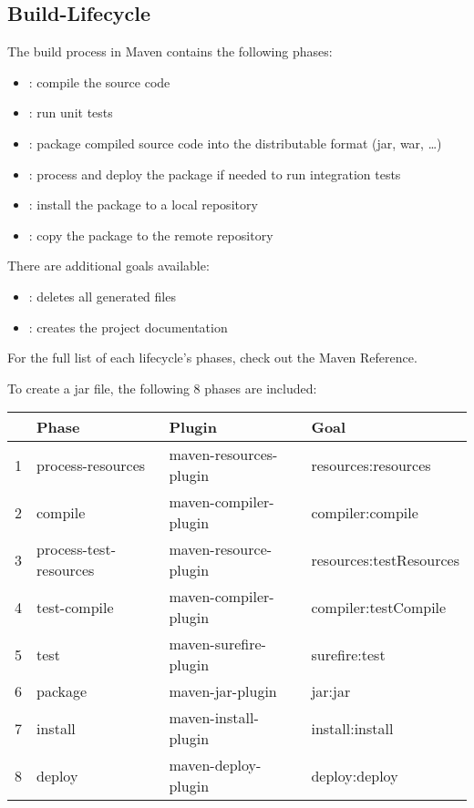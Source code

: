 \subsection{Build-Lifecycle}
The build process in Maven contains the following phases:
\begin{itemize}
\item {}: compile the source code
\item {}: run unit tests
\item {}: package compiled source code into the distributable format (jar, war, …)
\item {}: process and deploy the package if needed to run integration tests
\item {}: install the package to a local repository
\item {}: copy the package to the remote repository
\end{itemize}
%
There are additional goals available:
\begin{itemize}
\item {}: deletes all generated files
\item {}: creates the project documentation
\end{itemize}
\newslide
For the full list of each lifecycle's phases, check out the Maven Reference.

\vspace{3mm}

To create a jar file, the following 8 phases are included:

\begin{tabularx}{\linewidth}{llll}
  & Phase &  Plugin & Goal\\
\hline
1 & process-resources & maven-resources-plugin & resources:resources\\
2 & compile & maven-compiler-plugin & compiler:compile\\
3 & process-test-resources & maven-resource-plugin & resources:testResources\\
4 & test-compile & maven-compiler-plugin & compiler:testCompile\\
5 & test & maven-surefire-plugin  & surefire:test\\
6 & package & maven-jar-plugin & jar:jar\\
7 & install & maven-install-plugin & install:install\\
8 & deploy & maven-deploy-plugin & deploy:deploy\\
\end{tabularx}
%
\newslide
